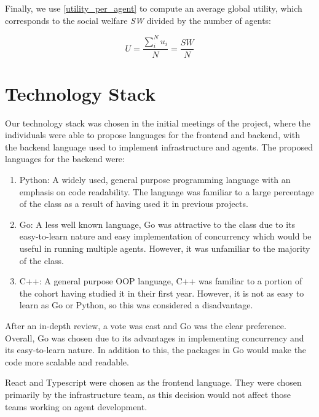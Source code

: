 Finally, we use \eqref{utility_per_agent} to compute an average global utility, which corresponds to the social welfare \textit{SW} divided by the number of agents:

\begin{equation}\label{utility_eq}
    \mathit{U}=\frac{\sum_i^N u_i}{N}=\frac{\mathit{SW}}{N}
\end{equation}

\section{Technology Stack}

Our technology stack was chosen in the initial meetings of the project, where the individuals were able to propose languages for the frontend and backend, with the backend language used to implement infrastructure and agents. The proposed languages for the backend were:
\begin{enumerate}
    \item Python: A widely used, general purpose programming language with an emphasis on code readability. The language was familiar to a large percentage of the class as a result of having used it in previous projects. 
    \item Go: A less well known language, Go was attractive to the class due to its easy-to-learn nature and easy implementation of concurrency which would be useful in running multiple agents. However, it was unfamiliar to the majority of the class.
    \item C++: A general purpose OOP language, C++ was familiar to a portion of the cohort having studied it in their first year. However, it is not as easy to learn as Go or Python, so this was considered a disadvantage.
\end{enumerate}

After an in-depth review, a vote was cast and Go was the clear preference. Overall, Go was chosen due to its advantages in implementing concurrency and its easy-to-learn nature. In addition to this, the packages in Go would make the code more scalable and readable.

React and Typescript were chosen as the frontend language. They were chosen primarily by the infrastructure team, as this decision would not affect those teams working on agent development. 




